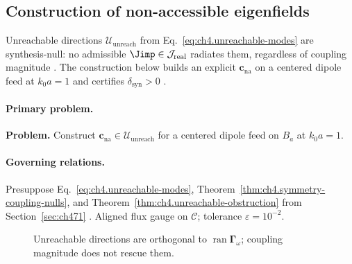 ﻿\subsection{Construction of non-accessible eigenfields}
\label{sec:ch4102}

Unreachable directions \(\mathcal{U}_{\mathrm{unreach}}\) from Eq.~\eqref{eq:ch4.unreachable-modes} are synthesis-null: no admissible \(\Jimp\in\mathcal{J}_{\mathrm{real}}\)
radiates them, regardless of coupling magnitude \cite{stratton1941,harrington2001,devaney2004,hansen1988}. The construction below builds an explicit
\(\mathbf{c}_{\mathrm{na}}\) on a centered dipole feed at \(k_{0}a=1\) and certifies \(\delta_{\mathrm{syn}}>0\) \cite{jackson1999}.

\paragraph{Primary problem.}
\textbf{Problem.} Construct \(\mathbf{c}_{\mathrm{na}}\in\mathcal{U}_{\mathrm{unreach}}\) for a centered dipole feed on \(B_{a}\) at \(k_{0}a=1\).

\paragraph{Governing relations.}
Presuppose Eq.~\eqref{eq:ch4.unreachable-modes}, Theorem~\ref{thm:ch4.symmetry-coupling-nulls}, and Theorem~\ref{thm:ch4.unreachable-obstruction} from
Section~\ref{sec:ch471} \cite{stratton1941,harrington2001,hansen1988,devaney2004,jackson1999}. Aligned flux gauge on \(\mathcal{C}\); tolerance \(\varepsilon=10^{-2}\).

\begin{figure}[t]
\centering
{}
\caption{Unreachable directions are orthogonal to \(\operatorname{ran}\boldsymbol{\Gamma}_\omega\); coupling magnitude does not rescue them.}
\label{fig:ch4.ex-unreachable-modes}
\end{figure}

